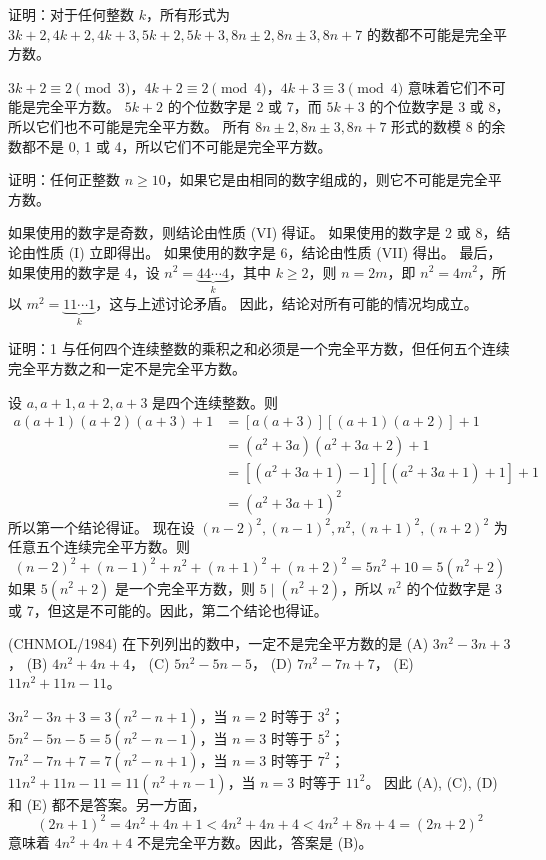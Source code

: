 \begin{questions}
\question 证明：对于任何整数 $k$，所有形式为 $3k + 2, 4k + 2, 4k + 3, 5k + 2, 5k + 3, 8n \pm 2, 8n \pm 3, 8n + 7$ 的数都不可能是完全平方数。

\begin{solution}
$3k + 2 \equiv 2 \pmod 3$，$4k + 2 \equiv 2 \pmod 4$，$4k + 3 \equiv 3 \pmod 4$ 意味着它们不可能是完全平方数。
$5k + 2$ 的个位数字是 2 或 7，而 $5k + 3$ 的个位数字是 3 或 8，所以它们也不可能是完全平方数。
所有 $8n \pm 2, 8n \pm 3, 8n + 7$ 形式的数模 8 的余数都不是 0, 1 或 4，所以它们不可能是完全平方数。
\end{solution}

\question 证明：任何正整数 $n \ge 10$，如果它是由相同的数字组成的，则它不可能是完全平方数。

\begin{solution}
如果使用的数字是奇数，则结论由性质 (VI) 得证。
如果使用的数字是 2 或 8，结论由性质 (I) 立即得出。
如果使用的数字是 6，结论由性质 (VII) 得出。
最后，如果使用的数字是 4，设 $n^2 = \underbrace{44 \cdots 4}_{k}$，其中 $k \ge 2$，则 $n = 2m$，即 $n^2 = 4m^2$，所以 $m^2 = \underbrace{11 \cdots 1}_{k}$，这与上述讨论矛盾。
因此，结论对所有可能的情况均成立。
\end{solution}

\question 证明：1 与任何四个连续整数的乘积之和必须是一个完全平方数，但任何五个连续完全平方数之和一定不是完全平方数。

\begin{solution}
设 $a, a + 1, a + 2, a + 3$ 是四个连续整数。则
\begin{align*}
a(a + 1)(a + 2)(a + 3) + 1 &= [a(a + 3)][(a + 1)(a + 2)] + 1\\
&= (a^2 + 3a)(a^2 + 3a + 2) + 1\\
&= [(a^2 + 3a + 1) - 1][(a^2 + 3a + 1) + 1] + 1\\
&= (a^2 + 3a + 1)^2
\end{align*}
所以第一个结论得证。
现在设 $(n - 2)^2, (n - 1)^2, n^2, (n + 1)^2, (n + 2)^2$ 为任意五个连续完全平方数。则
\[
(n - 2)^2 + (n - 1)^2 + n^2 + (n + 1)^2 + (n + 2)^2 = 5n^2 + 10 = 5(n^2 + 2)
\]
如果 $5(n^2 + 2)$ 是一个完全平方数，则 $5 \mid (n^2 + 2)$，所以 $n^2$ 的个位数字是 3 或 7，但这是不可能的。因此，第二个结论也得证。
\end{solution}

\question (CHNMOL/1984) 在下列列出的数中，一定不是完全平方数的是
(A) $3n^2 - 3n + 3$， (B) $4n^2 + 4n + 4$， (C) $5n^2 - 5n - 5$，
(D) $7n^2 - 7n + 7$， (E) $11n^2 + 11n - 11$。

\begin{solution}
$3n^2 - 3n + 3 = 3(n^2 - n + 1)$，当 $n = 2$ 时等于 $3^2$；
$5n^2 - 5n - 5 = 5(n^2 - n - 1)$，当 $n = 3$ 时等于 $5^2$；
$7n^2 - 7n + 7 = 7(n^2 - n + 1)$，当 $n = 3$ 时等于 $7^2$；
$11n^2 + 11n - 11 = 11(n^2 + n - 1)$，当 $n = 3$ 时等于 $11^2$。
因此 (A), (C), (D) 和 (E) 都不是答案。另一方面，
\[
(2n + 1)^2 = 4n^2 + 4n + 1 < 4n^2 + 4n + 4 < 4n^2 + 8n + 4 = (2n + 2)^2
\]
意味着 $4n^2 + 4n + 4$ 不是完全平方数。因此，答案是 (B)。
\end{solution}


\end{questions}
